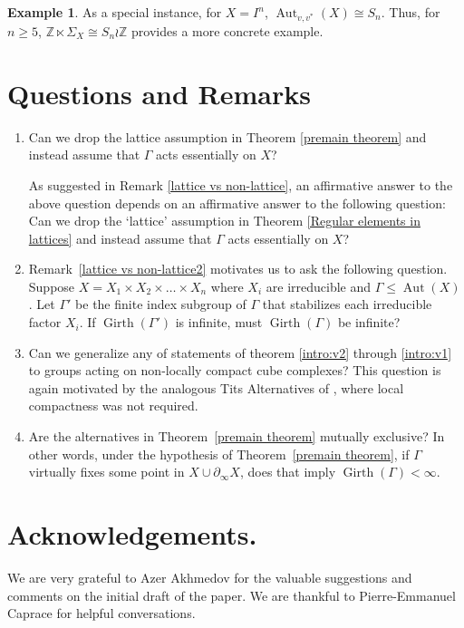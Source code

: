 \documentclass{amsart}
\theoremstyle{definition}
\newtheorem{example}[theorem]{Example}
\newtheorem*{Notation warning}{Warning on notations}
\newtheorem*{Sketch of proof}{Sketch of proof for Theorem C}
\DeclareMathOperator{\Gir}{Girth}
\def\aut{\mathop{\mathrm{Aut}}\nolimits}
\begin{document}
\begin{sloppypar}
\begin{example}
    As a special instance, for $X=I^n$, $\aut_{v,v^*}(X)\cong S_n$. Thus, for $n\geq5$, $\mathbb{Z}\ltimes\Sigma_X\cong S_n\wr\mathbb{Z}$ provides a more concrete example.
\end{example}

\medskip

\section{Questions and Remarks}

\begin{enumerate}
    \item Can we drop the lattice assumption in Theorem \ref{premain theorem} and instead assume that $\Gamma$ acts essentially on $X$?
    
   \noindent As suggested in Remark \ref{lattice vs non-lattice}, an affirmative answer to the above question depends on an affirmative answer to the following question: 
 Can we drop the `lattice' assumption in Theorem \ref{Regular elements in lattices} and instead assume that $\Gamma$ acts essentially on $X$? 

 \item Remark~\ref{lattice vs non-lattice2} motivates us to ask the following question.
 Suppose $X=X_1\times X_2\times \ldots\times X_n$ where $X_i$ are irreducible and $\Gamma\le\aut(X)$. Let $\Gamma'$ be the finite index subgroup of $\Gamma$ that stabilizes each irreducible factor $X_i$.
 If $\Gir(\Gamma')$ is infinite, must $\Gir(\Gamma)$ be infinite?

        \item Can we generalize any of statements of theorem \ref{intro:v2} through \ref{intro:v1} to groups acting on non-locally compact cube complexes? This question is again motivated by the analogous Tits Alternatives of \cite{Caprace_2011}, where local compactness was not required.
    
     \item Are the alternatives in Theorem~\ref{premain theorem} mutually exclusive? In other words, under the hypothesis of Theorem~\ref{premain theorem}, if $\Gamma$ virtually fixes some point in $X\cup \partial_\infty X$, does that imply $\Gir(\Gamma)<\infty$.
\end{enumerate}

\section{Acknowledgements.}

We are very grateful to Azer Akhmedov for the valuable suggestions and comments on the initial draft of the paper. We are thankful to Pierre-Emmanuel Caprace for helpful conversations.

   
 \printbibliography

\end{sloppypar}
\end{document}
